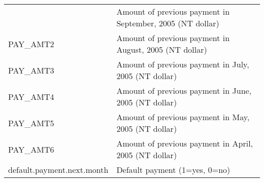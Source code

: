 \documentclass[]{article}
\begin{document}
\begin{longtable}[]{@{}ll@{}}
\begin{minipage}[t]{0.24\columnwidth}
\end{minipage} & \begin{minipage}[t]{0.70\columnwidth}\raggedright\strut
Amount of previous payment in September, 2005 (NT dollar)\strut
\end{minipage}\tabularnewline
\begin{minipage}[t]{0.24\columnwidth}\raggedright\strut
PAY\_AMT2\strut
\end{minipage} & \begin{minipage}[t]{0.70\columnwidth}\raggedright\strut
Amount of previous payment in August, 2005 (NT dollar)\strut
\end{minipage}\tabularnewline
\begin{minipage}[t]{0.24\columnwidth}\raggedright\strut
PAY\_AMT3\strut
\end{minipage} & \begin{minipage}[t]{0.70\columnwidth}\raggedright\strut
Amount of previous payment in July, 2005 (NT dollar)\strut
\end{minipage}\tabularnewline
\begin{minipage}[t]{0.24\columnwidth}\raggedright\strut
PAY\_AMT4\strut
\end{minipage} & \begin{minipage}[t]{0.70\columnwidth}\raggedright\strut
Amount of previous payment in June, 2005 (NT dollar)\strut
\end{minipage}\tabularnewline
\begin{minipage}[t]{0.24\columnwidth}\raggedright\strut
PAY\_AMT5\strut
\end{minipage} & \begin{minipage}[t]{0.70\columnwidth}\raggedright\strut
Amount of previous payment in May, 2005 (NT dollar)\strut
\end{minipage}\tabularnewline
\begin{minipage}[t]{0.24\columnwidth}\raggedright\strut
PAY\_AMT6\strut
\end{minipage} & \begin{minipage}[t]{0.70\columnwidth}\raggedright\strut
Amount of previous payment in April, 2005 (NT dollar)\strut
\end{minipage}\tabularnewline
\begin{minipage}[t]{0.24\columnwidth}\raggedright\strut
default.payment.next.month\strut
\end{minipage} & \begin{minipage}[t]{0.70\columnwidth}\raggedright\strut
Default payment (1=yes, 0=no)\strut
\end{minipage}\tabularnewline
\bottomrule
\end{longtable}
\end{document}
